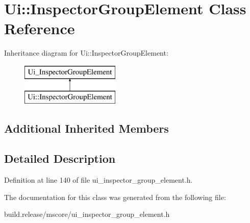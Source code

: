 \hypertarget{class_ui_1_1_inspector_group_element}{}\section{Ui\+:\+:Inspector\+Group\+Element Class Reference}
\label{class_ui_1_1_inspector_group_element}
Inheritance diagram for Ui\+:\+:Inspector\+Group\+Element\+:\begin{figure}[H]
\begin{center}
\leavevmode
\includegraphics[height=2.000000cm]{class_ui_1_1_inspector_group_element}
\end{center}
\end{figure}
\subsection*{Additional Inherited Members}


\subsection{Detailed Description}


Definition at line 140 of file ui\+\_\+inspector\+\_\+group\+\_\+element.\+h.



The documentation for this class was generated from the following file\+:\begin{DoxyCompactItemize}
\item 
build.\+release/mscore/ui\+\_\+inspector\+\_\+group\+\_\+element.\+h\end{DoxyCompactItemize}
